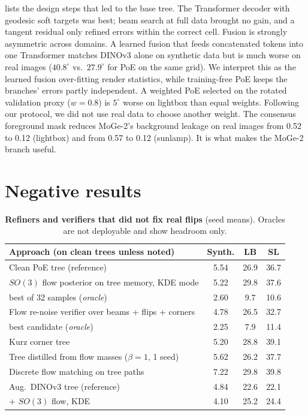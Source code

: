  lists the design steps that led to the base tree. The Transformer decoder with geodesic soft targets was best; beam search at full data brought no gain, and a tangent residual only refined errors within the correct cell.
Fusion is strongly asymmetric across domains. A learned fusion that feeds concatenated tokens into one Transformer matches DINOv3 alone on synthetic data but is much worse on real images ($40.8^\circ$ vs.\ $27.9^\circ$ for PoE on the same grid). We interpret this as the learned fusion over-fitting render statistics, while training-free PoE keeps the branches' errors partly independent.
A weighted PoE selected on the rotated validation proxy ($w{=}0.8$) is $5^\circ$ worse on lightbox than equal weights. Following our protocol, we did not use real data to choose another weight.
The consensus foreground mask reduces MoGe-2's background leakage on real images from 0.52 to 0.12 (lightbox) and from 0.57 to 0.12 (sunlamp). It is what makes the MoGe-2 branch useful.

\section{Negative results}
\label{sec:supp_negative}
\begin{table}[h]
  \centering\footnotesize
  \setlength{\tabcolsep}{2.5pt}
  \begin{tabular}{@{}lccc@{}}
    \toprule
    Approach (on clean trees unless noted) & Synth. & LB & SL \\
    \midrule
    Clean PoE tree (reference) & 5.54 & 26.9 & 36.7 \\
    $SO(3)$ flow posterior on tree memory, KDE mode & 5.22 & 29.8 & 37.6 \\
    \quad best of 32 samples (\emph{oracle}) & 2.60 & 9.7 & 10.6 \\
    Flow re-noise verifier over beams + flips + corners & 4.78 & 26.5 & 32.7 \\
    \quad best candidate (\emph{oracle}) & 2.25 & 7.9 & 11.4 \\
    Kurz corner tree~\cite{kurz2017tesseract} & 5.20 & 28.8 & 39.1 \\
    Tree distilled from flow masses ($\beta{=}1$, 1 seed) & 5.62 & 26.2 & 37.7 \\
    Discrete flow matching on tree paths & 7.22 & 29.8 & 39.8 \\
    \midrule
    Aug.\ DINOv3 tree (reference) & 4.84 & 22.6 & 22.1 \\
    \quad + $SO(3)$ flow, KDE & 4.10 & 25.2 & 24.4 \\
    \bottomrule
  \end{tabular}
  \caption{\textbf{Refiners and verifiers that did not fix real flips} (seed means). Oracles are not deployable and show headroom only.}
  \label{tab:negative}
\end{table}

